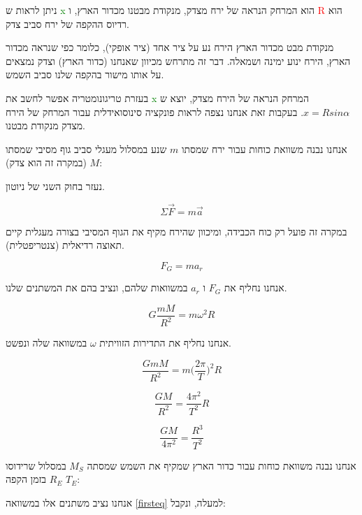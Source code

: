 \documentclass[a4paper, 12pt]{article}
\begin{document}
    \begin{flushright}
        ניתן לראות ש \textcolor{green}{x} הוא המרחק הנראה של ירח מצדק,
        מנקודת מבטנו מכדור הארץ, ו \textcolor{red}{R} הוא רדיוס ההקפה של ירח סביב צדק.

        מנקודת מבט מכדור הארץ הירח נע על ציר אחד (ציר אופקי), כלומר
        כפי שנראה מכדור הארץ, הירח ינוע ימינה ושמאלה.
        דבר זה מתרחש מכיוון שאנחנו (כדור הארץ) וצדק נמצאים על אותו מישור בהקפה שלנו סביב השמש.
        
        בעזרת טריגונומטריה אפשר לחשב את \textcolor{green}{x} המרחק הנראה של הירח מצדק,
        יוצא ש
        $ x = Rsin{\alpha} $.
        בעקבות זאת אנחנו נצפה לראות פונקציה סינוסואידלית עבור המרחק של הירח מצדק 
        מנקודת מבטנו.
    \end{flushright}

    \pagebreak %

    \begin{flushright}
        אנחנו נבנה
        משוואת כוחות עבור ירח שמסתו $m$ שנע במסלול מעגלי סביב גוף מסיבי שמסתו $M$ (במקרה זה הוא צדק):
        
        נעזר בחוק השני של ניוטון.

        $$ \Sigma \vec{F} = m\vec{a} $$ 

        במקרה זה פועל רק כוח הכבידה, ומיכוון שהירח מקיף את הגוף המסיבי בצורה מעגלית
        קיים תאוצה רדיאלית (צנטריפטלית). 

        $$ F_G = ma_r $$

        אנחנו נחליף את $F_G$ ו $a_r$ במשוואות שלהם, ונציב בהם את המשתנים שלנו.

        $$ G\dfrac{mM}{R^2} = m \omega^2 R$$

        אנחנו נחליף את התדירות הזוויתית $\omega$ במשוואה שלה ונפשט.
        
        $$ \dfrac{GmM}{R^2} = m \biggl(\dfrac{2\pi}{T}\biggl)^2 R $$
        
        $$ \dfrac{GM}{R^2} = \dfrac{4\pi^2}{T^2} R $$
    \end{flushright}

    \begin{english}
        \begin{equation}
            \label{firsteq}
            \dfrac{GM}{4\pi^2} = \dfrac{R^3}{T^2}
        \end{equation}
    \end{english}

    \begin{flushright}
        אנחנו נבנה
        משוואת כוחות עבור כדור הארץ שמקיף את השמש שמסתה $M_S$ במסלול שרידוסו
        $R_E$ בזמן הקפה $T_E$:

        אנחנו נציב משתנים אלו במשוואה \ref{firsteq} למעלה, ונקבל:
    \end{flushright}
\end{document}
